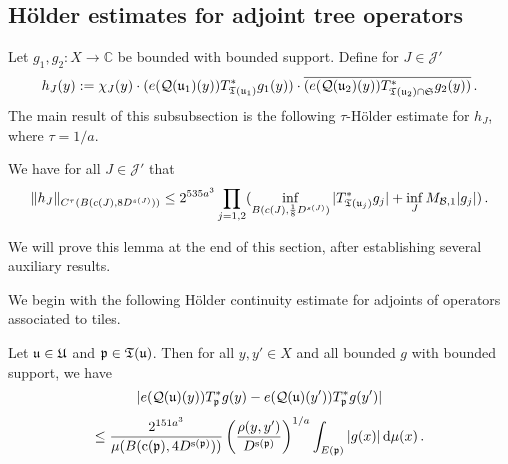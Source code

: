 {\subsection{Hölder estimates for adjoint tree operators}
\label{subsubsec-holder-estimates}
    Let $g_1, g_2:X \to \mathbb{C}$  be bounded with bounded support.
    Define for $J \in \mathcal{J}'$
    \begin{equation}
        \label{def-hj}
        h_J(y) := \chi_J(y)\cdot(e({\mathcal{Q}}({\mathfrak u}_1)(y)) T_{{\mathfrak T}({\mathfrak u}_1)}^* g_1(y)) \cdot \overline{(e({\mathcal{Q}}({\mathfrak u}_2)(y)) T_{{\mathfrak T}({\mathfrak u}_2) \cap \mathfrak{S}}^* g_2(y))}\,.
    \end{equation}
    The main result of this subsubsection is the following $\tau$-Hölder estimate for $h_J$, where $\tau = 1/a$.

    \begin{lemma}
        \label{Holder-correlation-tree}
        We have for all $J \in \mathcal{J}'$ that
        \begin{equation}
            \label{hHölder}
            \|h_J\|_{C^{\tau}(B(c(J), 8D^{s(J)}))} \le  2^{535a^3}   \prod_{j = 1,2} (\inf_{B(c(J), \frac{1}{8}D^{s(J)})} |T_{{\mathfrak T}({\mathfrak u}_j)}^* g_j| + \inf_J M_{\mathcal{B}, 1} |g_j|)\,.
        \end{equation}
    \end{lemma}

    We will prove this lemma at the end of this section, after establishing several auxiliary results.

    We begin with the following Hölder continuity estimate for adjoints of operators associated to tiles.
    \begin{lemma}
        \label{Holder-correlation-tile}
        Let ${\mathfrak u} \in {\mathfrak U}$ and ${\mathfrak p} \in {\mathfrak T}({\mathfrak u})$.  Then for all $y, y' \in X$ and all bounded $g$ with bounded support, we have
        $$
            |e({\mathcal{Q}}({\mathfrak u})(y)) T_{{\mathfrak p}}^* g(y) - e({\mathcal{Q}}({\mathfrak u})(y')) T_{{\mathfrak p}}^* g(y')|
        $$
        \begin{equation}
            \label{T*Hölder2}
            \le \frac{2^{151a^3}}{\mu(B({\mathrm{c}}({\mathfrak p}), 4D^{{\mathrm{s}}({\mathfrak p})}))} \left(\frac{\rho(y, y')}{D^{{\mathrm{s}}({\mathfrak p})}}\right)^{1/a}  \int_{E({\mathfrak p})} |g(x)| \, \mathrm{d}\mu(x)\,.
        \end{equation}
    \end{lemma}

}
